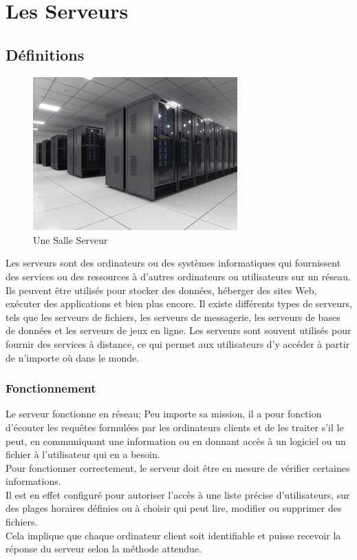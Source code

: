  
 
  \chapter{ Les Serveurs}
 \section{Définitions} 
	\begin{figure}[h]
		 \begin{center}
		  \includegraphics[width=0.7\textwidth]{PhotoMemoire/salle-serveur.jpg}
		\caption{Une Salle Serveur \cite{7}}
	\end{center}
	\end{figure}
Les serveurs sont des ordinateurs ou des systèmes informatiques qui fournissent des services ou des ressources à d'autres ordinateurs ou utilisateurs sur un réseau. Ils peuvent être utilisés pour stocker des données, héberger des sites Web, exécuter des applications et bien plus encore. Il existe différents types de serveurs, tels que les serveurs de fichiers, les serveurs de messagerie, les serveurs de bases de données et les serveurs de jeux en ligne. Les serveurs sont souvent utilisés pour fournir des services à distance, ce qui permet aux utilisateurs d'y accéder à partir de n'importe où dans le monde.
 \subsection*{Fonctionnement}
 Le serveur fonctionne en réseau; Peu importe sa mission, il a pour fonction d’écouter les requêtes formulées par les ordinateurs clients et de les traiter s’il le peut, en communiquant une information ou en donnant accès à un logiciel ou un fichier à l’utilisateur qui en a besoin.\\
 Pour fonctionner correctement, le serveur doit être en mesure de vérifier certaines informations.\\
 Il est en effet configuré pour autoriser l’accès à une liste précise d’utilisateurs, sur des plages horaires définies ou à choisir qui peut lire, modifier ou supprimer des fichiers.\\
 Cela implique que chaque ordinateur client soit identifiable et puisse recevoir la réponse du serveur selon la méthode attendue.
